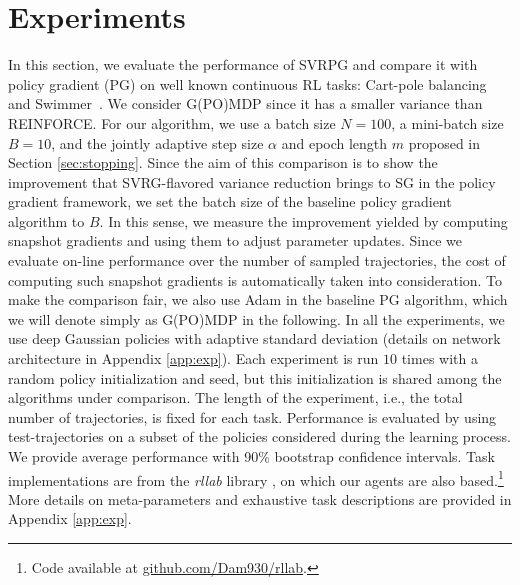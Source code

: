 \documentclass{article}
\makeatletter
\theoremstyle{remark}
\theoremstyle{definition}
\DeclareRobustCommand{\eg}{e.g.,\@\xspace}
\DeclareRobustCommand{\ie}{i.e.,\@\xspace}
\newcommand{\vtheta}{\boldsymbol{\theta}}
\newcommand{\Reward}{\mathcal{R}}
\newcommand{\score}[2]{\nabla\log p_{#1}(#2)}
\makeatother
\begin{document}
\section{Experiments}\label{sec:exp}
\vspace{-0.05in}
In this section, we evaluate the performance of SVRPG and compare it with policy gradient (PG) on well known continuous RL tasks: Cart-pole balancing and Swimmer~\citep[\eg][]{duan2016benchmarking}.
We consider G(PO)MDP since it has a smaller variance than REINFORCE.
For our algorithm, we use a batch size $N=100$, a mini-batch size $B=10$, and the jointly adaptive step size $\alpha$ and epoch length $m$ proposed in Section \ref{sec:stopping}. Since the aim of this comparison is to show the improvement that SVRG-flavored variance reduction brings to SG in the policy gradient framework, we set the batch size of the baseline policy gradient algorithm to $B$. In this sense, we measure the improvement yielded by computing snapshot gradients and using them to adjust parameter updates. Since we evaluate on-line performance over the number of sampled trajectories, the cost of computing such snapshot gradients is automatically taken into consideration. To make the comparison fair, we also use Adam in the baseline PG algorithm, which we will denote simply as G(PO)MDP in the following.
In all the experiments, we use deep Gaussian policies with adaptive standard deviation (details on network architecture in Appendix \ref{app:exp}).
Each experiment is run $10$ times with a random policy initialization and seed, but this initialization is shared among the algorithms under comparison.
The length of the experiment, \ie the total number of trajectories, is fixed for each task. Performance is evaluated by using test-trajectories on a subset of the policies considered during the learning process. We provide average performance with 90\% bootstrap confidence intervals.  
Task implementations are from the \textit{rllab} library \cite{duan2016benchmarking}, on which our agents are also based.\footnote{Code available at \url{github.com/Dam930/rllab}.}
More details on meta-parameters and exhaustive task descriptions are provided in Appendix \ref{app:exp}.
\end{document}
